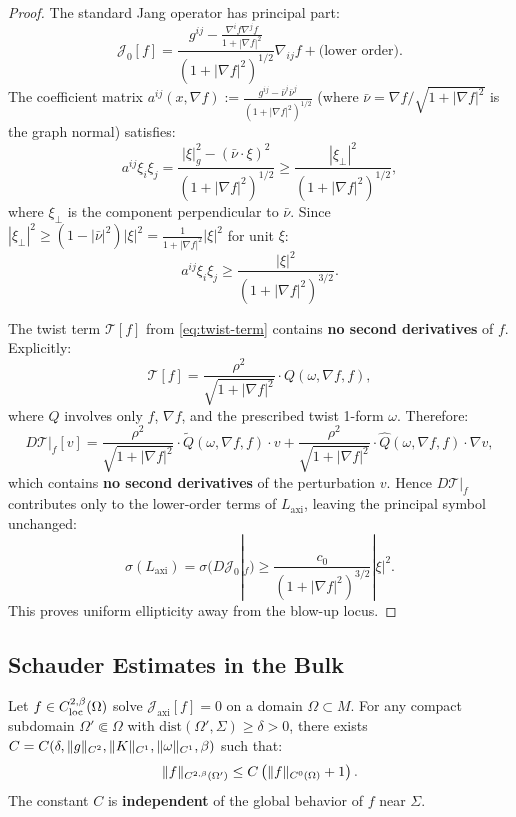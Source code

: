 \begin{proof}
The standard Jang operator has principal part:
\[
\mathcal{J}_0[f] = \frac{g^{ij} - \frac{\nabla^i f \nabla^j f}{1 + |\nabla f|^2}}{(1 + |\nabla f|^2)^{1/2}} \nabla_{ij} f + \text{(lower order)}.
\]
The coefficient matrix $a^{ij}(x, \nabla f) := \frac{g^{ij} - \bar{\nu}^i \bar{\nu}^j}{(1 + |\nabla f|^2)^{1/2}}$ (where $\bar{\nu} = \nabla f / \sqrt{1 + |\nabla f|^2}$ is the graph normal) satisfies:
\[
a^{ij}\xi_i \xi_j = \frac{|\xi|_g^2 - (\bar{\nu} \cdot \xi)^2}{(1 + |\nabla f|^2)^{1/2}} \geq \frac{|\xi_\perp|^2}{(1 + |\nabla f|^2)^{1/2}},
\]
where $\xi_\perp$ is the component perpendicular to $\bar{\nu}$. Since $|\xi_\perp|^2 \geq (1 - |\bar{\nu}|^2)|\xi|^2 = \frac{1}{1+|\nabla f|^2}|\xi|^2$ for unit $\xi$:
\[
a^{ij}\xi_i\xi_j \geq \frac{|\xi|^2}{(1 + |\nabla f|^2)^{3/2}}.
\]

The twist term $\mathcal{T}[f]$ from \eqref{eq:twist-term} contains \textbf{no second derivatives} of $f$. Explicitly:
\[
\mathcal{T}[f] = \frac{\rho^2}{\sqrt{1 + |\nabla f|^2}} \cdot Q(\omega, \nabla f, f),
\]
where $Q$ involves only $f$, $\nabla f$, and the prescribed twist 1-form $\omega$. Therefore:
\[
D\mathcal{T}|_f[v] = \frac{\rho^2}{\sqrt{1 + |\nabla f|^2}} \cdot \tilde{Q}(\omega, \nabla f, f) \cdot v + \frac{\rho^2}{\sqrt{1 + |\nabla f|^2}} \cdot \hat{Q}(\omega, \nabla f, f) \cdot \nabla v,
\]
which contains \textbf{no second derivatives} of the perturbation $v$. Hence $D\mathcal{T}|_f$ contributes only to the lower-order terms of $L_{\mathrm{axi}}$, leaving the principal symbol unchanged:
\[
\sigma(L_{\mathrm{axi}}) = \sigma(D\mathcal{J}_0|_f) \geq \frac{c_0}{(1 + |\nabla f|^2)^{3/2}} |\xi|^2.
\]
This proves uniform ellipticity away from the blow-up locus.
\end{proof}

\subsection{Schauder Estimates in the Bulk}

\begin{theorem}\label{thm:schauder-interior}
Let $f \in C^{2,\beta}_{\mathrm{loc}}(\Omega)$ solve $\mathcal{J}_{\mathrm{axi}}[f] = 0$ on a domain $\Omega \subset M$. For any compact subdomain $\Omega' \Subset \Omega$ with $\mathrm{dist}(\Omega', \Sigma) \geq \delta > 0$, there exists $C = C(\delta, \|g\|_{C^2}, \|K\|_{C^1}, \|\omega\|_{C^1}, \beta)$ such that:
\begin{equation}\label{eq:schauder-interior}
\|f\|_{C^{2,\beta}(\Omega')} \leq C\left(\|f\|_{C^0(\Omega)} + 1\right).
\end{equation}
The constant $C$ is \textbf{independent} of the global behavior of $f$ near $\Sigma$.
\end{theorem}

